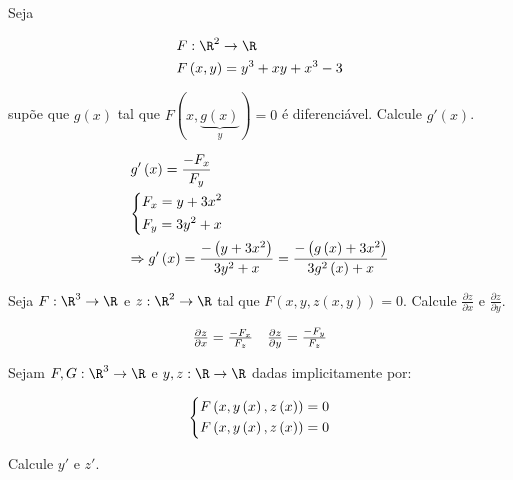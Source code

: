 \documentclass[11pt, oneside, a4paper]{gsm-l}
\begin{document}
\begin{exem}
Seja

\[
\begin{gathered}
F:\R^2  \to \R \hfill \\
F\left( {x,y} \right) = y^3  + xy + x^3  - 3 \hfill \\
\end{gathered}
\]

    supõe que $g(x)$ tal que $F\left( {x,\underbrace {g\left( x \right)}_y} \right) = 0$ é diferenciável. Calcule $g'\left( x \right)$.
\end{exem}

\begin{sol}
\[
\begin{gathered}
g'\left( x \right) = \frac{{ - F_x }}
{{F_y }} \hfill \\
\left\{ \begin{gathered}
F_x  = y + 3x^2  \hfill \\
F_y  = 3y^2  + x \hfill \\
\end{gathered}  \right. \hfill \\
\Rightarrow g'\left( x \right) = \frac{{ - \left( {y + 3x^2 } \right)}}
{{3y^2  + x}} = \frac{{ - \left( {g\left( x \right) + 3x^2 } \right)}}
{{3g^2 \left( x \right) + x}} \hfill \\
\end{gathered}
\]

\end{sol}

\begin{exem}
    Seja $F:\R^3  \to \R$ e $z:\R^2  \to \R$ tal que $F\left( {x,y,z\left( {x,y} \right)} \right) = 0$. Calcule $\frac{{\partial z}}{{\partial x}}$ e $\frac{{\partial z}}{{\partial y}}$.
\end{exem}

\begin{sol}
\[
\begin{array}{*{20}c}
{\frac{{\partial z}}
{{\partial x}} = \frac{{ - F_x }}
{{F_z }}} & {\frac{{\partial z}}
{{\partial y}} = \frac{{ - F_y }}
{{F_z }}}  \\

\end{array}
\]

\end{sol}

\begin{exem}
    Sejam $F,G:\R^3  \to \R$ e $y,z:\R \to \R$ dadas implicitamente por:

\[
\left\{ \begin{gathered}
F\left( {x,y\left( x \right),z\left( x \right)} \right) = 0 \hfill \\
F\left( {x,y\left( x \right),z\left( x \right)} \right) = 0 \hfill \\
\end{gathered}  \right.
\]

Calcule $y'$ e $z'$.
\end{exem}
\end{document}
